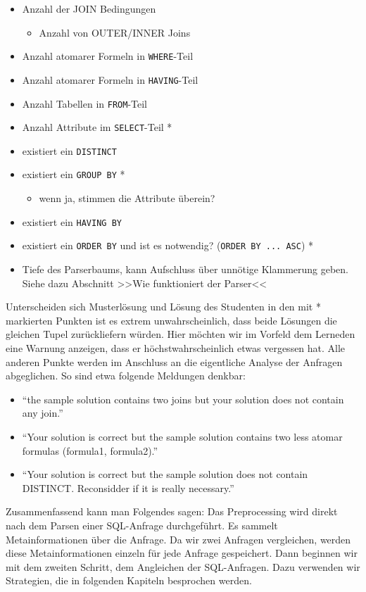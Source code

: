 \begin{itemize}
\item Anzahl der JOIN Bedingungen
	\begin{itemize}
	\item Anzahl von OUTER/INNER Joins
	\end{itemize}
\item Anzahl atomarer Formeln in \verb|WHERE|-Teil
\item Anzahl atomarer Formeln in \verb|HAVING|-Teil
\item Anzahl Tabellen in \verb|FROM|-Teil
\item Anzahl Attribute im \verb|SELECT|-Teil *
\item existiert ein \verb|DISTINCT|
\item existiert ein \verb|GROUP BY| *
	\begin{itemize}
	\item wenn ja, stimmen die Attribute überein?
	\end{itemize}	 
\item existiert ein \verb|HAVING BY|
\item existiert ein \verb|ORDER BY| und ist es notwendig? (\verb|ORDER BY ... ASC|) *
\item Tiefe des Parserbaums, kann Aufschluss über unnötige Klammerung geben. Siehe dazu Abschnitt >>Wie funktioniert der Parser<<
\end{itemize}

Unterscheiden sich Musterlösung und Lösung des Studenten in den mit * markierten Punkten ist es extrem unwahrscheinlich, dass beide Lösungen die gleichen Tupel zurückliefern würden. Hier möchten wir im Vorfeld dem Lerneden eine Warnung anzeigen, dass er höchstwahrscheinlich etwas vergessen hat. Alle anderen Punkte werden im Anschluss an die eigentliche Analyse der Anfragen abgeglichen. So sind etwa folgende Meldungen denkbar:

\begin{itemize}
\item ``the sample solution contains two joins but your solution does not contain any join.''
\item ``Your solution is correct but the sample solution contains two less atomar formulas (formula1, formula2).''
\item ``Your solution is correct but the sample solution does not contain DISTINCT. Reconsidder if it is really necessary.''
\end{itemize}

Zusammenfassend kann man Folgendes sagen: Das Preprocessing wird direkt nach dem Parsen einer SQL-Anfrage durchgeführt. Es sammelt Metainformationen über die Anfrage. Da wir zwei Anfragen vergleichen, werden diese Metainformationen einzeln für jede Anfrage gespeichert. Dann beginnen wir mit dem zweiten Schritt, dem Angleichen der SQL-Anfragen. Dazu verwenden wir Strategien, die in folgenden Kapiteln besprochen werden.

